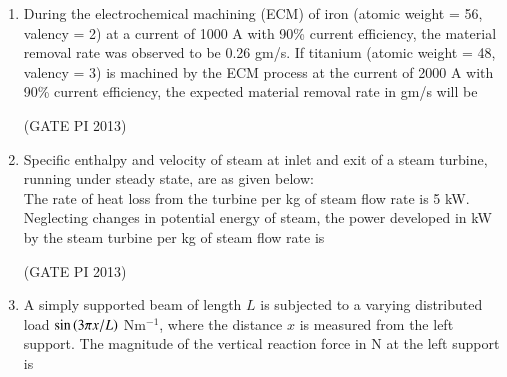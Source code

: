 \documentclass[journal,12pt,onecolumn]{IEEEtran}
\theoremstyle{remark}
\begin{document}
\begin{enumerate}
\item During the electrochemical machining (ECM) of iron (atomic weight = 56, valency = 2) at a current of 1000 A with 90\% current efficiency, the material removal rate was observed to be 0.26 gm/s. If titanium (atomic weight = 48, valency = 3) is machined by the ECM process at the current of 2000 A with 90\% current efficiency, the expected material removal rate in gm/s will be


\begin{enumerate}
\end{enumerate}

\hfill (GATE PI 2013)

\item Specific enthalpy and velocity of steam at inlet and exit of a steam turbine, running under steady state, are as given below: \\



\bigskip
The rate of heat loss from the turbine per kg of steam flow rate is 5 kW. Neglecting changes in potential energy of steam, the power developed in kW by the steam turbine per kg of steam flow rate is

\begin{enumerate}
\end{enumerate}

\hfill (GATE PI 2013)

\item A simply supported beam of length $L$ is subjected to a varying distributed load $\sin \left(3\pi x/L\right)$ Nm$^{-1}$, where the distance $x$ is measured from the left support. The magnitude of the vertical reaction force in N at the left support is

\begin{enumerate}
\end{enumerate}


\end{enumerate}
\end{document}
